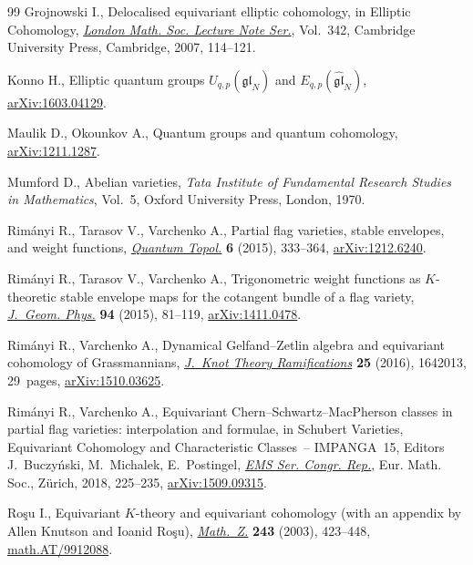 \documentclass[10pt,a4paper]{amsart}
\numberwithin{equation}{section}
\begin{document}
\begin{thebibliography}{99}
Grojnowski I., Delocalised equivariant elliptic cohomology, in Elliptic
 Cohomology, \href{https://doi.org/10.1017/CBO9780511721489.007}{\textit{London Math. Soc. Lecture Note Ser.}}, Vol.~342, Cambridge
 University Press, Cambridge, 2007, 114--121.

Konno H., Elliptic quantum groups $U_{q,p}(\widehat{{\mathfrak{gl}}}_N)$ and
 $E_{q,p}(\widehat{{\mathfrak{gl}}}_N)$, \href{https://arxiv.org/abs/1603.04129}{arXiv:1603.04129}.

Maulik D., Okounkov A., Quantum groups and quantum cohomology,
 \href{https://arxiv.org/abs/1211.1287}{arXiv:1211.1287}.

Mumford D., Abelian varieties, \textit{Tata Institute of Fundamental Research
 Studies in Mathematics}, Vol.~5, Oxford University Press, London, 1970.

Rim\'{a}nyi R., Tarasov V., Varchenko A., Partial flag varieties, stable
 envelopes, and weight functions, \href{https://doi.org/10.4171/QT/65}{\textit{Quantum Topol.}} \textbf{6} (2015),
 333--364, \href{https://arxiv.org/abs/1212.6240}{arXiv:1212.6240}.

Rim\'{a}nyi R., Tarasov V., Varchenko A., Trigonometric weight functions as
 {$K$}-theoretic stable envelope maps for the cotangent bundle of a flag
 variety, \href{https://doi.org/10.1016/j.geomphys.2015.04.002}{\textit{J.~Geom. Phys.}} \textbf{94} (2015), 81--119,
 \href{https://arxiv.org/abs/1411.0478}{arXiv:1411.0478}.

Rim\'{a}nyi R., Varchenko A., Dynamical {G}elfand--{Z}etlin algebra and
 equivariant cohomology of {G}rassman\-nians, \href{https://doi.org/10.1142/S021821651642013X}{\textit{J.~Knot Theory
 Ramifications}} \textbf{25} (2016), 1642013, 29~pages, \href{https://arxiv.org/abs/1510.03625}{arXiv:1510.03625}.

Rim\'{a}nyi R., Varchenko A., Equivariant {C}hern--{S}chwartz--{M}ac{P}herson
 classes in partial flag varieties: inter\-po\-lation and formulae, in Schubert
 Varieties, Equivariant Cohomology and Characteristic Classes~-- {IMPANGA}~15,
 Editors J.~Buczy\'nski, M.~Michalek, E.~Postingel, \href{https://doi.org/10.4171/182-1/10}{\textit{EMS Ser. Congr. Rep.}}, Eur.
 Math. Soc., Z\"{u}rich, 2018, 225--235, \href{https://arxiv.org/abs/1509.09315}{arXiv:1509.09315}.

Ro\c{s}u I., Equivariant {$K$}-theory and equivariant cohomology (with an appendix
 by {A}llen {K}nutson and {I}oanid {R}o\c{s}u), \href{https://doi.org/10.1007/s00209-002-0447-1}{\textit{Math.~Z.}} \textbf{243}
 (2003), 423--448, \href{https://arxiv.org/abs/math.AT/9912088}{math.AT/9912088}.


\end{thebibliography}
\end{document}
